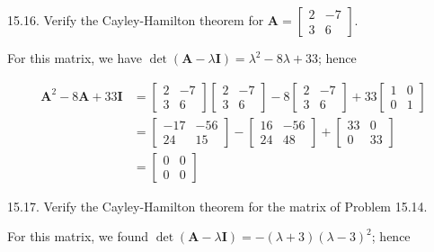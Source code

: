\documentclass[10pt]{article}
\begin{document}
15.16. Verify the Cayley-Hamilton theorem for $\mathbf{A}=\left[\begin{array}{rr}2 & -7 \\ 3 & 6\end{array}\right]$.

For this matrix, we have $\operatorname{det}(\mathbf{A}-\lambda \mathbf{I})=\lambda^{2}-8 \lambda+33$; hence

$$
\begin{aligned}
\mathbf{A}^{2}-8 \mathbf{A}+33 \mathbf{I} & =\left[\begin{array}{rr}
2 & -7 \\
3 & 6
\end{array}\right]\left[\begin{array}{rr}
2 & -7 \\
3 & 6
\end{array}\right]-8\left[\begin{array}{rr}
2 & -7 \\
3 & 6
\end{array}\right]+33\left[\begin{array}{ll}
1 & 0 \\
0 & 1
\end{array}\right] \\
& =\left[\begin{array}{rr}
-17 & -56 \\
24 & 15
\end{array}\right]-\left[\begin{array}{rr}
16 & -56 \\
24 & 48
\end{array}\right]+\left[\begin{array}{rr}
33 & 0 \\
0 & 33
\end{array}\right] \\
& =\left[\begin{array}{ll}
0 & 0 \\
0 & 0
\end{array}\right]
\end{aligned}
$$

15.17. Verify the Cayley-Hamilton theorem for the matrix of Problem 15.14.

For this matrix, we found $\operatorname{det}(\mathbf{A}-\lambda \mathbf{I})=-(\lambda+3)(\lambda-3)^{2}$; hence
\end{document}
